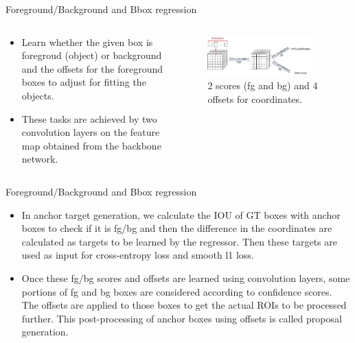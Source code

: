 \documentclass{beamer}
\begin{document}
\begin{frame}{Foreground/Background and Bbox regression}
	\begin{columns}
		\begin{column}{0.45\textwidth}
			\begin{itemize}
				\item Learn whether the given box is foregroud (object) or background and the offsets for the foreground boxes to adjust for fitting the objects.
				\item These tasks are achieved by two convolution layers on the feature map obtained from the backbone network.
			\end{itemize}
		\end{column}
		\begin{column}{0.55\textwidth}
			\begin{figure}
				\centering
				\includegraphics[width=0.9\textwidth]{images/rpn_networks.jpeg}
				\caption{2 scores (fg and bg) and 4 offsets for coordinates.}
			\end{figure}
		\end{column}
	\end{columns}
\end{frame}

\begin{frame}{Foreground/Background and Bbox regression}
	\begin{itemize}
		\item In anchor target generation, we calculate the IOU of GT boxes with anchor boxes to check if it is fg/bg and then the difference in the coordinates are calculated as targets to be learned by the regressor. Then these targets are used as input for cross-entropy loss and smooth l1 loss.
		\item Once these fg/bg scores and offsets are learned using convolution layers, some portions of fg and bg boxes are considered according to confidence scores. The offsets are applied to those boxes to get the actual ROIs to be processed further. This post-processing of anchor boxes using offsets is called proposal generation.
	\end{itemize}
\end{frame}
\end{document}

